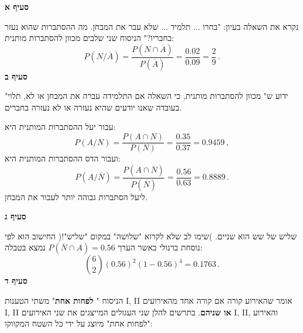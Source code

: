 \vspace{-2ex}

\begin{center}
\end{center}

\smallskip

\textbf{סעיף א}

נקרא את השאלה בעיון: "בחרו 
$\ldots$
תלמיד 
$\ldots$
שלא עבר את המבחן. מה ההסתברות שהוא נעזר בחבריו?" הניסוח שני שלבים מכוון להסתברות מותנית:
\[
P(N/\overline{A})=\frac{P(N\cap \overline{A})}{P(\overline{A})}=\frac{0.02}{0.09}=\frac{2}{9}\,.
\]
\textbf{סעיף ב}

"ידוע ש" מכוון להסתברות מותנית, כי השאלה אם התלמידה עברה את המבחן או לא, תלוי בעובדה שאנו יודעים שהיא נעזרה או לא נעזרה בחברים.

עבור יעל ההסתברות המותנית היא:
\[
P(A/N)=\frac{P(A \cap N)}{P(N)}=\frac{0.35}{0.37}=0.9459\,,
\]
ועבור הדס ההסתברות המותנית היא:
\[
P(A/\overline{N})=\frac{P(A\cap \overline{N})}{P(\overline{N})}=\frac{0.56}{0.63}=0.8889\,.
\]
ליעל הסתברות גבוהה יותר לעבור את המבחן.

\smallskip

\textbf{סעיף ג}

שליש של שש הוא שניים. )שימו לב שלא לקרוא "שלושה" במקום "שליש"!( החישוב הוא לפי נוסחת ברנולי כאשר הערך
$P(\overline{N}\cap A)=0.56$
נמצא בטבלה:
\[
{6 \choose 2}(0.56)^2 (1-0.56)^4=0.1763\,.
\]
\textbf{סעיף ד}

הניסוח "%
\textbf{לפחות אחת}"
משתי הטענות I, II אומר שהאירוע קורה אם קורה אחד מהאירועים I, II 
\textbf{או שניהם}.
בתרשים להלן שני העגולים המייצגים את שני האירועים I, II, והאירוע "לפחות אחת" מיוצג על ידי כל השטח המקווקו:

\np

\begin{center}
\end{center}


